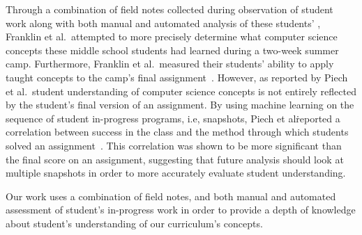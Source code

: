 Through a combination of field notes collected during observation of student
work along with both manual and automated analysis of these students'
, Franklin et al.\ attempted to more precisely determine what
computer science concepts these middle school students had learned during a
two-week summer camp. Furthermore, Franklin et al.\ measured their students'
ability to apply taught concepts to the camp's final
assignment~\cite{Boe:2013:HLS:2445196.2445265, Franklin:2013:SBO}. However, as
reported by Piech et al.\, student understanding of computer science concepts
is not entirely reflected by the student's final version of an assignment. By
using machine learning on the sequence of student in-progress programs, i.e,
snapshots, Piech et al\. reported a correlation between success in the class
and the method through which students solved an
assignment~\cite{Piech:2012:MSL:2157136.2157182}. This correlation was shown to
be more significant than the final score on an assignment, suggesting that
future analysis should look at multiple snapshots in order to more accurately
evaluate student understanding.

Our work uses a combination of field notes, and both manual and automated
assessment of student's in-progress work in order to provide a depth of
knowledge about student's understanding of our curriculum's concepts.
